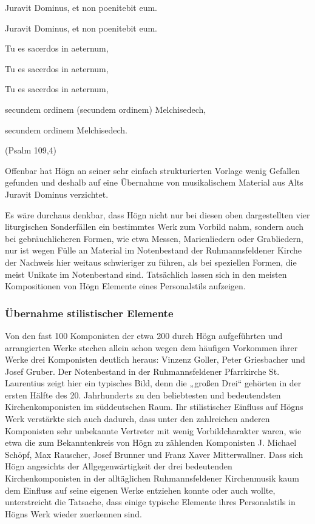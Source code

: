 \documentclass[a4paper]{article}
\begin{document}
Juravit Dominus, et non poenitebit eum. 

Juravit Dominus, et non poenitebit eum. 

Tu es sacerdos in aeternum,

Tu es sacerdos in aeternum,

Tu es sacerdos in aeternum,

secundem ordinem (secundem ordinem) Melchisedech, 

secundem ordinem Melchisedech.

(Psalm 109,4)

Offenbar hat Högn an seiner sehr einfach strukturierten Vorlage wenig
Gefallen gefunden und deshalb auf eine Übernahme von musikalischem
Material aus Alts Juravit Dominus verzichtet. 

Es wäre durchaus denkbar, dass Högn nicht nur bei diesen oben
dargestellten vier liturgischen Sonderfällen ein bestimmtes Werk zum
Vorbild nahm, sondern auch bei gebräuchlicheren Formen, wie etwa
Messen, Marienliedern oder Grabliedern, nur ist wegen Fülle an Material
im Notenbestand der Ruhmannsfeldener Kirche der Nachweis hier weitaus
schwieriger zu führen, als bei speziellen Formen, die meist Unikate im
Notenbestand sind. Tatsächlich lassen sich in den meisten Kompositionen
von Högn Elemente eines Personalstils aufzeigen.

\subsubsection{Übernahme stilistischer Elemente}
\hypertarget{RefHeadingToc100333750}{}Von den fast 100 Komponisten der
etwa 200 durch Högn aufgeführten und arrangierten Werke stechen allein
schon wegen dem häufigen Vorkommen ihrer Werke drei Komponisten
deutlich heraus: Vinzenz Goller, Peter Griesbacher und Josef Gruber.
Der Notenbestand in der Ruhmannsfeldener Pfarrkirche St. Laurentius
zeigt hier ein typisches Bild, denn die „großen Drei“ gehörten in der
ersten Hälfte des 20. Jahrhunderts zu den beliebtesten und
bedeutendsten Kirchenkomponisten im süddeutschen Raum. Ihr
stilistischer Einfluss auf Högns Werk verstärkte sich auch dadurch,
dass unter den zahlreichen anderen Komponisten sehr unbekannte
Vertreter mit wenig Vorbildcharakter waren, wie etwa die zum
Bekanntenkreis von Högn zu zählenden Komponisten J. Michael Schöpf, Max
Rauscher, Josef Brunner und Franz Xaver Mitterwallner. Dass sich Högn
angesichts der Allgegenwärtigkeit der drei bedeutenden
Kirchenkomponisten in der alltäglichen Ruhmannsfeldener Kirchenmusik
kaum dem Einfluss auf seine eigenen Werke entziehen konnte oder auch
wollte, unterstreicht die Tatsache, dass einige typische Elemente ihres
Personalstils in Högns Werk wieder zuerkennen sind. 
\end{document}
